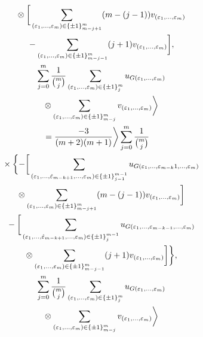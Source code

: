 \documentclass[10pt,a4paper]{amsart}
\numberwithin{equation}{section}
\begin{document}
\begin{enumerate}
\begin{itemize}
\begin{gather*}
\hphantom{\eta_{13}^\phi(e_{4k-j_1},e_{4k-j_2}) =}{}
 \otimes\bigg[ \sum_{(\varepsilon_{1},\dots, \varepsilon_{m})\in\{\pm
1\}_{m-j+1}^{m}}(m-(j-1))v_{(\varepsilon_{1},\dots,\varepsilon_m)}\\
\hphantom{\eta_{13}^\phi(e_{4k-j_1},e_{4k-j_2}) =}{}
-\sum_{(\varepsilon_{1},\dots, \varepsilon_{m})\in\{\pm
1\}_{m-j-1}^{m}}(j+1)v_{(\varepsilon_{1},\dots,\varepsilon_m)}\bigg] ,\\
\hphantom{\eta_{13}^\phi(e_{4k-j_1},e_{4k-j_2}) =}{}
\sum_{j=0}^{m}\frac{1}{{m\choose j}}\sum_{(\varepsilon_{1},\dots, \varepsilon_{m})\in\{\pm
1\}_{j}^{m}}u_{G(\varepsilon_1,\dots,\varepsilon_m)}\\
\hphantom{\eta_{13}^\phi(e_{4k-j_1},e_{4k-j_2}) =}{}
\otimes
\sum_{(\varepsilon_{1},\dots, \varepsilon_{m})\in\{\pm 1\}_{m-j}^{m}}v_{(\varepsilon_1,\dots,\varepsilon_m)}\bigg\rangle\\
\hphantom{\eta_{13}^\phi(e_{4k-j_1},e_{4k-j_2})}{}
 = \frac{-3}{(m+2)(m+1)}\bigg\rangle \sum_{j=0}^{m}\frac{1}{{m\choose j}}\\
\hphantom{\eta_{13}^\phi(e_{4k-j_1},e_{4k-j_2})=}{} \times
 \bigg\{ {-}\bigg[ \sum_{(\varepsilon_{1},\dots,\hat{\varepsilon}_{m-k+1},\dots, \varepsilon_{m})\in\{\pm
1\}_{j-1}^{m-1}}u_{G(\varepsilon_{1},\dots, \varepsilon_{m-k} 1,\dots,\varepsilon_{m})}\\
\hphantom{\eta_{13}^\phi(e_{4k-j_1},e_{4k-j_2})=}{}
\otimes \sum_{(\varepsilon_{1},\dots,
\varepsilon_{m})\in\{\pm 1\}_{m-j+1}^{m}}(m-(j-1))v_{(\varepsilon_{1},\dots,\varepsilon_m)}\bigg]\\
\hphantom{\eta_{13}^\phi(e_{4k-j_1},e_{4k-j_2})=}{}
 - \bigg[ \sum_{(\varepsilon_{1},\dots,\hat{\varepsilon}_{m-k+1},\dots, \varepsilon_{m})\in\{\pm
1\}_{j}^{m-1}}u_{G(\varepsilon_{1},\dots, \varepsilon_{m-k -1} ,\dots,\varepsilon_{m})}\\
\hphantom{\eta_{13}^\phi(e_{4k-j_1},e_{4k-j_2})=}{}
\otimes \sum_{(\varepsilon_{1},\dots, \varepsilon_{m})\in\{\pm
1\}_{m-j-1}^{m}}(j+1)v_{(\varepsilon_{1},\dots,\varepsilon_m)}\bigg] \bigg\},\\
\hphantom{\eta_{13}^\phi(e_{4k-j_1},e_{4k-j_2})=}{}
 \sum_{j=0}^{m}\frac{1}{{m\choose j}}\sum_{(\varepsilon_{1},\dots, \varepsilon_{m})\in\{\pm
1\}_{j}^{m}}u_{G(\varepsilon_1,\dots,\varepsilon_m)}\\
\hphantom{\eta_{13}^\phi(e_{4k-j_1},e_{4k-j_2})=}{}
\otimes \sum_{(\varepsilon_{1},\dots, \varepsilon_{m})\in\{\pm 1\}_{m-j}^{m}}v_{(\varepsilon_1,\dots,\varepsilon_m)}\bigg\rangle \\
\hphantom{\eta_{13}^\phi(e_{4k-j_1},e_{4k-j_2})}{}

\end{gather*}
\end{itemize}
\end{enumerate}
\end{document}
